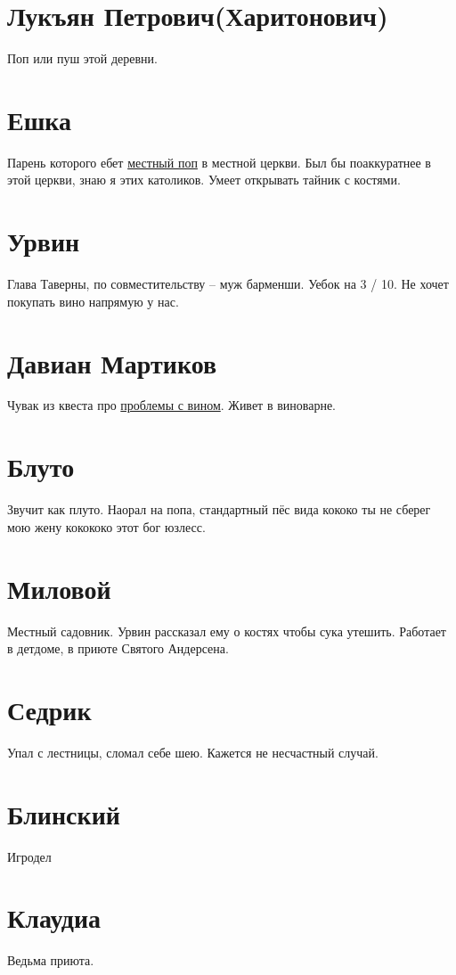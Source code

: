 \documentclass[letterpaper,twocolumn,openany,nodeprecatedcode]{dndbook}
\begin{document}
\section{Лукъян Петрович(Харитонович)}\label{sec:pop}
Поп или пуш этой деревни.

\section{Ешка}\label{sec:yeshka}
Парень которого ебет \hyperref[sec:pop]{местный поп} в местной церкви. Был бы поаккуратнее в этой церкви, знаю я этих католиков. Умеет открывать тайник с костями.

\section{Урвин}\label{sec:urvin}
Глава Таверны, по совместительству -- муж барменши. Уебок на 3 / 10. Не хочет покупать вино напрямую у нас. 

\section{Давиан Мартиков}\label{sec:davian_martyakov}
Чувак из квеста про \hyperref[sec:wine_problems]{проблемы с вином}. Живет в виноварне. 

\section{Блуто}
Звучит как плуто. Наорал на попа, стандартный пёс вида кококо ты не сберег мою жену кокококо этот бог юзлесс.

\section{Миловой}
Местный садовник. Урвин рассказал ему о костях чтобы сука утешить. Работает в детдоме, в приюте Святого Андерсена.

\section{Седрик}
Упал с лестницы, сломал себе шею. Кажется не несчастный случай.

\section{Блинский}
Игродел

\section{Клаудиа}
Ведьма приюта.
\end{document}
